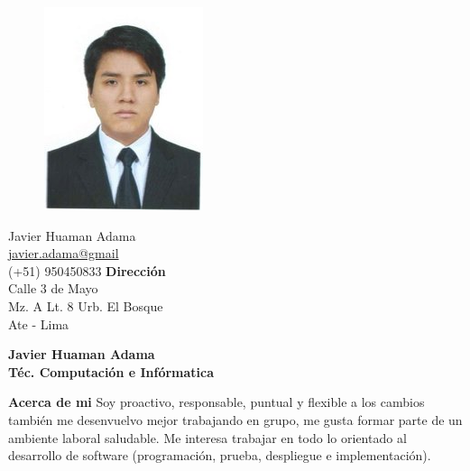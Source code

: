 \documentclass[a4paper,12pt,final]{memoir}
\newcommand{\Sep}{\vspace{1.5em}}
\newenvironment{AboutMe}
	{\ignorespaces\textbf{\color{RoyalBlue} Acerca de mi}}
	{\Sep\ignorespacesafterend}
\begin{document}
\begin{figure}
	\hfill
	\includegraphics[width=0.6\columnwidth]{profile}
	\vspace{-7cm}
\end{figure}

\begin{flushright}\small
	Javier Huaman Adama \\
	\url{javier.adama@gmail}  \\
	(+51) 950450833
	\Sep
	\textbf{Dirección} \\
	Calle 3 de Mayo \\ %
	Mz. A Lt. 8 Urb. El Bosque \\ %
	Ate - Lima \\ %
\end{flushright}\normalsize
\framebreak


\Huge\bfseries {\color{RoyalBlue} Javier Huaman Adama} \\
\Large\bfseries  Téc. Computación e Infórmatica \\

\normalsize\normalfont

\begin{AboutMe}
Soy proactivo, responsable, puntual y flexible a los cambios también me desenvuelvo mejor trabajando en grupo, me gusta formar parte de un ambiente laboral saludable. Me interesa trabajar en todo lo orientado al desarrollo de software (programación, prueba, despliegue e implementación).
\end{AboutMe}
\end{document}
